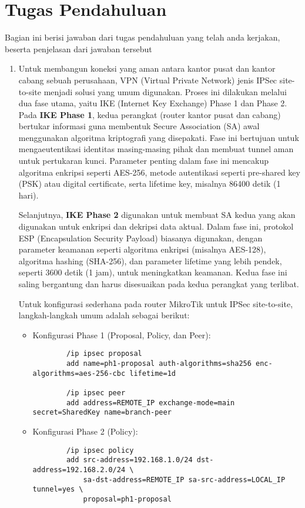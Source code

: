 \section{Tugas Pendahuluan}
Bagian ini berisi jawaban dari tugas pendahuluan yang telah anda kerjakan, beserta penjelasan dari jawaban tersebut
\begin{enumerate}
	\item 
	Untuk membangun koneksi yang aman antara kantor pusat dan kantor cabang sebuah perusahaan, VPN 
	(Virtual Private Network) jenis IPSec site-to-site menjadi solusi yang umum digunakan. Proses ini 
	dilakukan melalui dua fase utama, yaitu IKE (Internet Key Exchange) Phase 1 dan Phase 2. Pada 
	\textbf{IKE Phase 1}, kedua perangkat (router kantor pusat dan cabang) bertukar informasi guna 
	membentuk Secure Association (SA) awal menggunakan algoritma kriptografi yang disepakati. Fase 
	ini bertujuan untuk mengaeutentikasi identitas masing-masing pihak dan membuat tunnel aman untuk 
	pertukaran kunci. Parameter penting dalam fase ini mencakup algoritma enkripsi seperti AES-256, 
	metode autentikasi seperti pre-shared key (PSK) atau digital certificate, serta lifetime key, 
	misalnya 86400 detik (1 hari).

	Selanjutnya, \textbf{IKE Phase 2} digunakan untuk membuat SA kedua yang akan digunakan untuk 
	enkripsi dan dekripsi data aktual. Dalam fase ini, protokol ESP (Encapsulation Security Payload) 
	biasanya digunakan, dengan parameter keamanan seperti algoritma enkripsi (misalnya AES-128), 
	algoritma hashing (SHA-256), dan parameter lifetime yang lebih pendek, seperti 3600 detik (1 jam), 
	untuk meningkatkan keamanan. Kedua fase ini saling bergantung dan harus disesuaikan pada kedua 
	perangkat yang terlibat.

	Untuk konfigurasi sederhana pada router MikroTik untuk IPSec site-to-site, langkah-langkah 
	umum adalah sebagai berikut:

	\begin{itemize}
		\item Konfigurasi Phase 1 (Proposal, Policy, dan Peer): 
		\begin{verbatim}
		/ip ipsec proposal
		add name=ph1-proposal auth-algorithms=sha256 enc-algorithms=aes-256-cbc lifetime=1d

		/ip ipsec peer
		add address=REMOTE_IP exchange-mode=main secret=SharedKey name=branch-peer
		\end{verbatim}
		
		\item Konfigurasi Phase 2 (Policy):
		\begin{verbatim}
		/ip ipsec policy
		add src-address=192.168.1.0/24 dst-address=192.168.2.0/24 \
			sa-dst-address=REMOTE_IP sa-src-address=LOCAL_IP tunnel=yes \
			proposal=ph1-proposal
		\end{verbatim}
	\end{itemize}


\end{enumerate}
